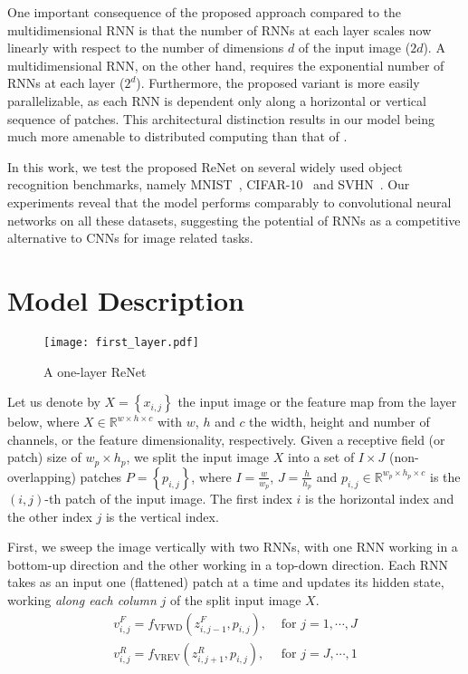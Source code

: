 \documentclass{article} \usepackage{nips15submit_e,times}
\newcommand{\RR}[0]{\mathbb{R}}
\begin{document}
One important consequence of the proposed approach compared to the
multidimensional RNN is that the number of RNNs at each layer scales now linearly
with respect to the number of dimensions $d$ of the input image ($2d$). A
multidimensional RNN, on the other hand, requires the exponential number of RNNs
at each layer ($2^d$). Furthermore, the proposed variant is more easily
parallelizable, as each RNN is dependent only along a horizontal or vertical
sequence of patches. This architectural distinction results in our model being
much more amenable to distributed computing than that of
\citet{Graves+Schmidhuber-2009}. 

In this work, we test the proposed ReNet on several widely used object
recognition benchmarks, namely  MNIST~\citep{Lecun99objectrecognition},
CIFAR-10~\citep{KrizhevskyHinton2009} and SVHN~\citep{Netzer-wkshp-2011}. Our
experiments reveal that the model performs comparably to convolutional neural
networks on all these datasets,
suggesting the potential of RNNs as a competitive alternative to CNNs for image
related tasks.

\section{Model Description}

\begin{wrapfigure}{R}{0.3\textwidth}
    \centering
    \texttt{[image: first\_layer.pdf]}
    \caption{A one-layer ReNet}
    \label{fig:networklayer}
    \vspace{-3mm}
\end{wrapfigure}

Let us denote by $X=\left\{x_{i,j}\right\}$ the input image or the feature map 
from the layer below, where $X \in \RR^{w \times h \times c}$ with $w$, $h$ and 
$c$ the width, height and number of channels, or the feature dimensionality, 
respectively. Given a receptive field (or patch) size of $w_p \times h_p$, we 
split the input image $X$ into a set of $I \times J$ (non-overlapping) patches 
$P = \left\{ p_{i,j} \right\}$, where $I = \frac{w}{w_p}$, $J = \frac{h}{h_p}$ 
and $p_{i,j} \in \RR^{w_p \times h_p \times c}$ is the $(i,j)$-th patch of the
input image. The first index $i$ is the horizontal index and the other index 
$j$ is the vertical index.

First, we sweep the image vertically with two RNNs, with one RNN working in
a bottom-up direction and the other working in a top-down direction. 
Each RNN takes as an input one (flattened) patch at a time and updates its
hidden state, working \emph{along each column} $j$ of the split input image $X$.
\begin{align}
    v^F_{i,j} = f_{\text{VFWD}}(z^F_{i,j-1},p_{i,j}), &\text{ for
    }j=1,\cdots, J\\
    v^R_{i,j} = f_{\text{VREV}}(z^R_{i,j+1},p_{i,j}), &\text{ for
    }j=J,\cdots,1 
\end{align}
\end{document}
